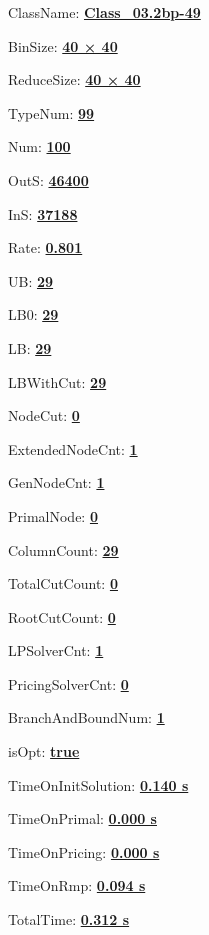 \documentclass[11pt]{article}
\begin{document}
\pagestyle{empty}


ClassName: \underline{\textbf{Class_03.2bp-49}}
\par
BinSize: \underline{\textbf{40 × 40}}
\par
ReduceSize: \underline{\textbf{40 × 40}}
\par
TypeNum: \underline{\textbf{99}}
\par
Num: \underline{\textbf{100}}
\par
OutS: \underline{\textbf{46400}}
\par
InS: \underline{\textbf{37188}}
\par
Rate: \underline{\textbf{0.801}}
\par
UB: \underline{\textbf{29}}
\par
LB0: \underline{\textbf{29}}
\par
LB: \underline{\textbf{29}}
\par
LBWithCut: \underline{\textbf{29}}
\par
NodeCut: \underline{\textbf{0}}
\par
ExtendedNodeCnt: \underline{\textbf{1}}
\par
GenNodeCnt: \underline{\textbf{1}}
\par
PrimalNode: \underline{\textbf{0}}
\par
ColumnCount: \underline{\textbf{29}}
\par
TotalCutCount: \underline{\textbf{0}}
\par
RootCutCount: \underline{\textbf{0}}
\par
LPSolverCnt: \underline{\textbf{1}}
\par
PricingSolverCnt: \underline{\textbf{0}}
\par
BranchAndBoundNum: \underline{\textbf{1}}
\par
isOpt: \underline{\textbf{true}}
\par
TimeOnInitSolution: \underline{\textbf{0.140 s}}
\par
TimeOnPrimal: \underline{\textbf{0.000 s}}
\par
TimeOnPricing: \underline{\textbf{0.000 s}}
\par
TimeOnRmp: \underline{\textbf{0.094 s}}
\par
TotalTime: \underline{\textbf{0.312 s}}
\par
\newpage


\end{document}
